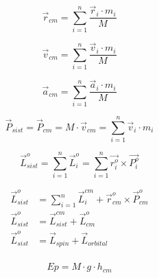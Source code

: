     
            
        \begin{equation}
            \vec{r}_{cm} = \sum_{i=1}^{n} \frac{\vec{r}_i\cdot m_i}{M}
        \end{equation}
    
        \begin{equation}
            \vec {v}_{cm} = \sum_{i=1}^{n} \frac{\vec{v}_i\cdot m_i}{M}
        \end{equation}

    \newpage
    
        \begin{equation}
            \vec {a}_{cm} = \sum_{i=1}^{n} \frac{\vec{a}_i\cdot m_i}{M}
        \end{equation}
        
        \begin{equation}
            \vec{P}_{sist} = \vec {P}_{cm} = {M} \cdot \vec{v}_{cm} = \sum_{i=1}^{n} \vec{v}_{i} \cdot m_i
        \end{equation}
    
        \begin{equation}
            \vec{L}_{sist}^o = \sum_{i=1}^{n} \vec{L}_{i}^o = \sum_{i=1}^n \overrightarrow{r_{i}^o} \times \overrightarrow{P_{i}^o}
        \end{equation}
        
        \begin{equation}
            \begin{split}
                \vec{L}_{sist}^o &= \sum_{i=1}^{n} \vec{L}_{i}^{cm} + \overrightarrow{r}_{cm}^o \times \overrightarrow{P}_{cm}^o\\
                \vec{L}_{sist}^o &= \vec{L}_{sist}^{cm} + \vec{L}_{cm}^o\\
                \vec{L}_{sist}^o &= \vec{L}_{spin} + \vec{L}_{orbital}\\
            \end{split}
        \end{equation}
    
        \begin{equation}
            Ep = M \cdot g \cdot h_{cm}
        \end{equation}    
    
